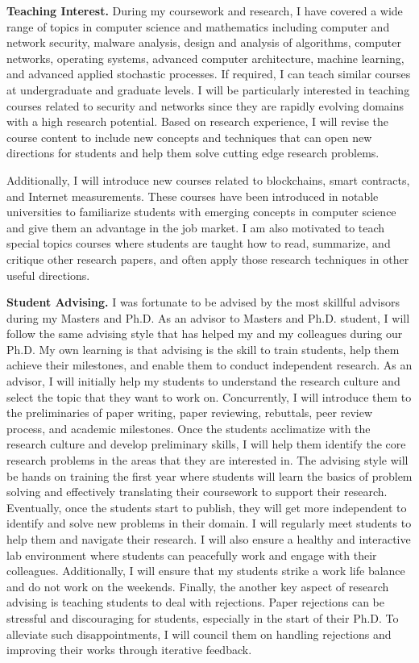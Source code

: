\documentclass{NSF}
\newcommand{\BfPara}[1]{{\noindent\textbf{#1.}}\xspace}
\begin{document}
\vspace{2mm}
\BfPara{Teaching Interest} During my coursework and research, I have covered a wide range of topics in computer science and mathematics including computer and network security, malware analysis, design and analysis of algorithms, computer networks, operating systems, advanced computer architecture, machine learning, and advanced applied stochastic processes. If required, I can teach similar courses at undergraduate and graduate levels. I will be particularly interested in teaching courses related to security and networks since they are rapidly evolving domains with a high research potential. Based on research experience, I will revise the course content to include new concepts and techniques that can open new directions for students and help them solve cutting edge research problems. 

Additionally, I will introduce new courses related to blockchains, smart contracts, and Internet measurements. These courses have been introduced in notable universities to familiarize students with emerging concepts in computer science and give them an advantage in the job market. I am also motivated to teach special topics courses where students are taught how to read, summarize, and critique other research papers, and often apply those research techniques in other useful directions. 


\vspace{2mm}
\BfPara{Student Advising} I was fortunate to be advised by the most skillful advisors during my Masters and Ph.D. As an advisor to Masters and Ph.D. student, I will follow the same advising style that has helped my and my colleagues during our Ph.D. My own learning is that advising is the skill to train students, help them achieve their milestones, and enable them to conduct independent research. As an advisor, I will initially help my students to understand the research culture and select the topic that they want to work on. Concurrently, I will introduce them to the preliminaries of paper writing, paper reviewing, rebuttals, peer review process, and academic milestones. Once the students acclimatize with the research culture and develop preliminary skills, I will help them identify the core research problems in the areas that they are interested in. The advising style will be hands on training the first year where students will learn the basics of problem solving and effectively translating their coursework to support their research. Eventually, once the students start to publish, they will get more independent to identify and solve new problems in their domain. I will regularly meet students to help them and navigate their research. I will also ensure a healthy and interactive lab environment where students can peacefully work and engage with their colleagues. Additionally, I will ensure that my students strike a work life balance and do not work on the weekends. Finally, the another key aspect of research advising is teaching students to deal with rejections. Paper rejections can be stressful and discouraging for students, especially in the start of their Ph.D. To alleviate such disappointments, I will council them on handling rejections and improving their works through iterative feedback. 

\end{document}
